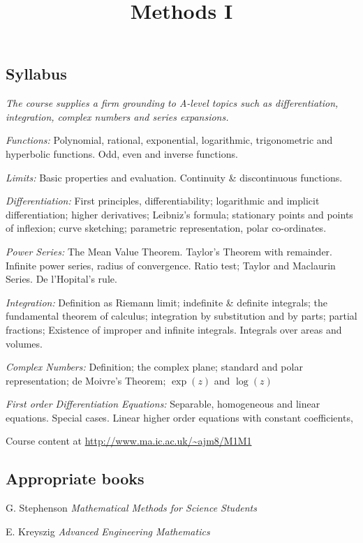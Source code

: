 \documentclass[10pt]{scrartcl}
\title{Methods I}
\begin{document}
{

\subsection*{Syllabus}
\textit{The course supplies a firm grounding to A-level topics such as differentiation, integration, complex numbers and series expansions.}

\emph{Functions:} Polynomial, rational, exponential, logarithmic, trigonometric and hyperbolic functions. Odd, even and inverse functions.

\emph{Limits:}
 Basic properties and evaluation. Continuity \& discontinuous functions.

\emph{Differentiation:}
 First principles, differentiability; logarithmic and implicit differentiation; higher derivatives; Leibniz's formula; stationary points and points of inflexion; curve sketching; parametric representation, polar co-ordinates.
 
\emph{Power Series:}
  The Mean Value Theorem. Taylor's Theorem with remainder. Infinite power series, radius of convergence. Ratio test; Taylor and Maclaurin Series. De l'Hopital's rule.
 
\emph{Integration:}
   Definition as Riemann limit; indefinite \& definite integrals; the fundamental theorem of calculus; integration by substitution and by parts; partial fractions; Existence of improper and infinite integrals. Integrals over areas and volumes.
  
  
\emph{Complex Numbers:}
  Definition; the complex plane; standard and polar representation; de Moivre's Theorem; $\exp(z)$ and $\log(z)$

\emph{First order Differentiation Equations:}
  Separable, homogeneous and linear equations. Special cases. Linear higher order equations with constant coefficients,

Course content at \url{http://www.ma.ic.ac.uk/~ajm8/M1M1}

\subsection*{Appropriate books}

{\shortskip
G. Stephenson \emph{Mathematical Methods for Science Students}

E. Kreyszig \emph{Advanced Engineering Mathematics} 
}
}


\TableofContents
\end{document}
